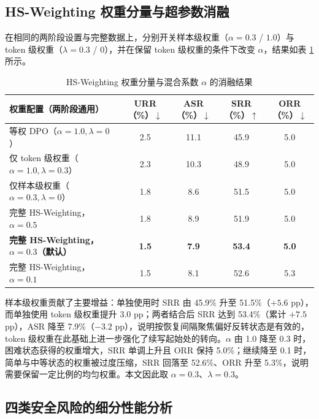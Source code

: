 \documentclass[fontset=fandol,type=master,campus=shenzhen,etitleauto=true]{hithesisbook}
\begin{document}
\subsection{HS-Weighting 权重分量与超参数消融}\label{rtw-results}

在相同的两阶段设置与完整数据上，分别开关样本级权重（$\alpha = 0.3$ / $1.0$）与 token 级权重（$\lambda = 0.3$ / $0$），并在保留 token 级权重的条件下改变 $\alpha$，结果如表 \ref{tab:rtw-results} 所示。

\begin{table}[htbp]
\centering
\caption{HS-Weighting 权重分量与混合系数 $\alpha$ 的消融结果}
\label{tab:rtw-results}
\small
\setlength{\tabcolsep}{4pt}
\renewcommand{\arraystretch}{1.15}
\begin{tabular}{p{5.4cm} c c c c}
\toprule
\textbf{权重配置（两阶段通用）} & \textbf{URR（\%）$\downarrow$} & \textbf{ASR（\%）$\downarrow$} & \textbf{SRR（\%）$\uparrow$} & \textbf{ORR（\%）$\downarrow$} \\
\midrule
等权 DPO（$\alpha=1.0, \lambda=0$） & 2.5 & 11.1 & 45.9 & 5.0 \\
仅 token 级权重（$\alpha=1.0, \lambda=0.3$） & 2.3 & 10.3 & 48.9 & 5.0 \\
仅样本级权重（$\alpha=0.3, \lambda=0$） & 1.8 & 8.6 & 51.5 & 5.0 \\
\midrule
完整 HS-Weighting，$\alpha=0.5$ & 1.8 & 8.9 & 51.9 & 5.0 \\
\textbf{完整 HS-Weighting，$\alpha=0.3$（默认）} & \textbf{1.5} & \textbf{7.9} & \textbf{53.4} & \textbf{5.0} \\
完整 HS-Weighting，$\alpha=0.1$ & 1.5 & 8.1 & 52.6 & 5.3 \\
\bottomrule
\end{tabular}
\end{table}

样本级权重贡献了主要增益：单独使用时 SRR 由 45.9\% 升至 51.5\%（$+5.6$ pp），而单独使用 token 级权重提升 3.0 pp；两者结合后 SRR 达到 53.4\%（累计 $+7.5$ pp），ASR 降至 7.9\%（$-3.2$ pp），说明按恢复间隔聚焦偏好反转状态是有效的，token 级权重在此基础上进一步强化了续写起始处的转向。$\alpha$ 由 1.0 降至 0.3 时，困难状态获得的权重增大，SRR 单调上升且 ORR 保持 5.0\%；继续降至 0.1 时，简单与中等状态的权重被过度压缩，SRR 回落至 52.6\%、ORR 升至 5.3\%，说明需要保留一定比例的均匀权重。本文因此取 $\alpha = 0.3$、$\lambda = 0.3$。

\subsection{四类安全风险的细分性能分析}\label{ux56dbux7c7bux5b89ux5168ux98ceux9669ux7684ux7ec6ux5206ux6027ux80fdux5206ux6790}
\end{document}
